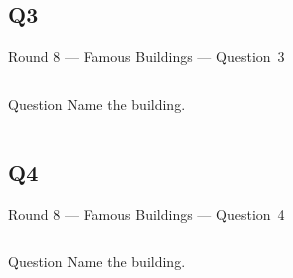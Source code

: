 \documentclass[11pt,draft]{beamer}
\begin{document}
\subsection*{Q3}
\begin{frame}[t]{Round 8 --- Famous Buildings --- \mbox{Question 3}}
    \begin{columns}[T,totalwidth=\linewidth]
        \begin{column}{0.32\linewidth}
            \begin{block}{Question}
                Name the building.
            \end{block}
        \end{column}
        \begin{column}{0.65\linewidth}
            \begin{center}
                \texttt{[image: \{Images/pantheonparis]}.jpeg}
            \end{center}
        \end{column}
    \end{columns}
\end{frame}
\subsection*{Q4}
\begin{frame}[t]{Round 8 --- Famous Buildings --- \mbox{Question 4}}
    \begin{columns}[T,totalwidth=\linewidth]
        \begin{column}{0.32\linewidth}
            \begin{block}{Question}
                Name the building.
            \end{block}
        \end{column}
        \begin{column}{0.65\linewidth}
            \begin{center}
                \texttt{[image: \{Images/pantheonrome]}.jpg}
            \end{center}
        \end{column}
    \end{columns}
\end{frame}
\end{document}
